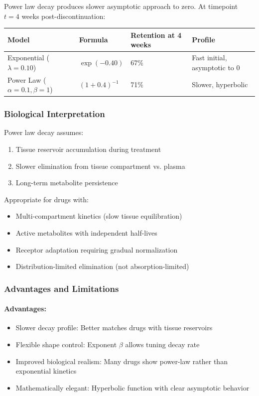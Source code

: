 \documentclass[11pt,a4paper]{article}
\begin{document}
Power law decay produces slower asymptotic approach to zero. At timepoint $t = 4$ weeks post-discontinuation:

\begin{center}
\begin{tabular}{llll}
  \toprule
  Model & Formula & Retention at 4 weeks & Profile \\
  \midrule
  Exponential ($\lambda=0.10$) & $\exp(-0.40)$ & 67\% & Fast initial, asymptotic to 0 \\
  Power Law ($\alpha=0.1, \beta=1$) & $(1+0.4)^{-1}$ & 71\% & Slower, hyperbolic \\
  \bottomrule
\end{tabular}
\end{center}

\subsubsection{Biological Interpretation}

Power law decay assumes:
\begin{enumerate}
  \item Tissue reservoir accumulation during treatment
  \item Slower elimination from tissue compartment vs. plasma
  \item Long-term metabolite persistence
\end{enumerate}

Appropriate for drugs with:
\begin{itemize}
  \item Multi-compartment kinetics (slow tissue equilibration)
  \item Active metabolites with independent half-lives
  \item Receptor adaptation requiring gradual normalization
  \item Distribution-limited elimination (not absorption-limited)
\end{itemize}

\subsubsection{Advantages and Limitations}

\paragraph{Advantages:}
\begin{itemize}
  \item Slower decay profile: Better matches drugs with tissue reservoirs
  \item Flexible shape control: Exponent $\beta$ allows tuning decay rate
  \item Improved biological realism: Many drugs show power-law rather than exponential kinetics
  \item Mathematically elegant: Hyperbolic function with clear asymptotic behavior
\end{itemize}
\end{document}
